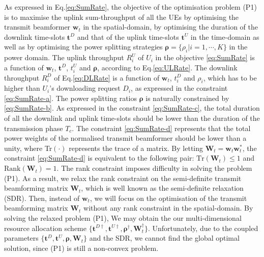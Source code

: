 \documentclass[12pt,draftcls,onecolumn,journal]{IEEEtran}
\begin{document}
As expressed in Eq.\eqref{eq:SumRate}, the objective of the optimisation problem (P1) is to maximise the uplink sum-throughput of all the UEs by optimising the transmit beamformer $\mathbf{w}_t$ in the spatial-domain, by optimising the duration of the downlink time-slots $\mathbf{t}^D$ and that of the uplink time-slots $\mathbf{t}^U$ in the time-domain as well as by optimising the power splitting strategies $\boldsymbol{\rho} = \{\rho_i | i = 1,\cdots, K\}$ in the power domain. The uplink throughput $R_i^U$ of $U_i$ in the objective \eqref{eq:SumRate} is a function of $\mathbf{w}_t$, $\mathbf{t}^D$, $t_i^U$ and $\boldsymbol{\rho}$, according to Eq.\eqref{eq:ULRate}. The downlink throughput $R_i^D$ of Eq.\eqref{eq:DLRate} is a function of $\mathbf{w}_t$, $t_i^D$ and $\rho_i$, which has to be higher than $U_i$'s downloading request $D_i$, as expressed in the constraint \eqref{eq:SumRate-a}. The power splitting ratios $\boldsymbol{\rho}$ is naturally constrained by \eqref{eq:SumRate-b}. As expressed in the constraint \eqref{eq:SumRate-c}, the total duration of all the downlink and uplink time-slots should be lower than the duration of the transmission phase $T_c$. The constraint \eqref{eq:SumRate-d} represents that the total power weights of the normalised transmit beamformer should be lower than a unity, where Tr$(\cdot)$ represents the trace of a matrix. By letting $\mathbf{W}_t = \mathbf{w}_t\mathbf{w}_t^*$, the constraint \eqref{eq:SumRate-d} is equivalent to the following pair: $\text{Tr}(\mathbf{W}_t) \leq 1$ and $\text{Rank}(\mathbf{W}_t) = 1$. The rank constraint imposes difficulty in solving the problem (P1). As a result, we relax the rank constraint on the semi-definite transmit beamforming matrix $\mathbf{W}_t$, which is well known as the semi-definite relaxation (SDR). Then, instead of $\mathbf{w}_t$, we will focus on the optimisation of the transmit beamforming matrix $\mathbf{W}_t$ without any rank constraint in the spatial-domain. By solving the relaxed problem (P1), We may obtain the our multi-dimensional resource allocation scheme $\{\mathbf{t}^{D\dagger}, \mathbf{t}^{U\dagger}, \boldsymbol{\rho}^\dagger, \mathbf{W}_t^\dagger\}$. Unfortunately, due to the coupled parameters $\{\mathbf{t}^{D}, \mathbf{t}^{U}, \boldsymbol{\rho}, \mathbf{W}_t\}$ and the SDR, we cannot find the global optimal solution, since (P1) is still a non-convex problem.
\end{document}

